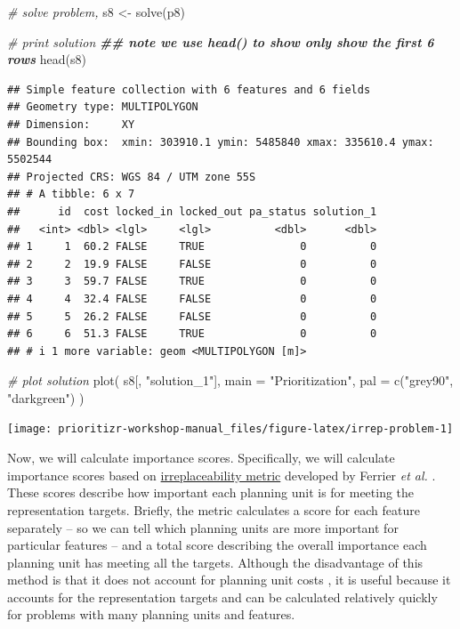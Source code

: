 \documentclass[
  12pt,
]{book}
\newenvironment{Shaded}{\begin{snugshade}}{\end{snugshade}}
\newcommand{\AttributeTok}[1]{\textcolor[rgb]{0.77,0.63,0.00}{#1}}
\newcommand{\CommentTok}[1]{\textcolor[rgb]{0.56,0.35,0.01}{\textit{#1}}}
\newcommand{\DocumentationTok}[1]{\textcolor[rgb]{0.56,0.35,0.01}{\textbf{\textit{#1}}}}
\newcommand{\FunctionTok}[1]{\textcolor[rgb]{0.00,0.00,0.00}{#1}}
\newcommand{\NormalTok}[1]{#1}
\newcommand{\OtherTok}[1]{\textcolor[rgb]{0.56,0.35,0.01}{#1}}
\newcommand{\StringTok}[1]{\textcolor[rgb]{0.31,0.60,0.02}{#1}}
\begin{document}
\begin{Shaded}
\begin{Highlighting}[]
\CommentTok{\# solve problem,}
\NormalTok{s8 }\OtherTok{\textless{}{-}} \FunctionTok{solve}\NormalTok{(p8)}

\CommentTok{\# print solution}
\DocumentationTok{\#\# note we use head() to show only show the first 6 rows}
\FunctionTok{head}\NormalTok{(s8)}
\end{Highlighting}
\end{Shaded}

\begin{verbatim}
## Simple feature collection with 6 features and 6 fields
## Geometry type: MULTIPOLYGON
## Dimension:     XY
## Bounding box:  xmin: 303910.1 ymin: 5485840 xmax: 335610.4 ymax: 5502544
## Projected CRS: WGS 84 / UTM zone 55S
## # A tibble: 6 x 7
##      id  cost locked_in locked_out pa_status solution_1
##   <int> <dbl> <lgl>     <lgl>          <dbl>      <dbl>
## 1     1  60.2 FALSE     TRUE               0          0
## 2     2  19.9 FALSE     FALSE              0          0
## 3     3  59.7 FALSE     TRUE               0          0
## 4     4  32.4 FALSE     FALSE              0          0
## 5     5  26.2 FALSE     FALSE              0          0
## 6     6  51.3 FALSE     TRUE               0          0
## # i 1 more variable: geom <MULTIPOLYGON [m]>
\end{verbatim}

\begin{Shaded}
\begin{Highlighting}[]
\CommentTok{\# plot solution}
\FunctionTok{plot}\NormalTok{(}
\NormalTok{  s8[, }\StringTok{"solution\_1"}\NormalTok{], }\AttributeTok{main =} \StringTok{"Prioritization"}\NormalTok{,}
  \AttributeTok{pal =} \FunctionTok{c}\NormalTok{(}\StringTok{"grey90"}\NormalTok{, }\StringTok{"darkgreen"}\NormalTok{)}
\NormalTok{)}
\end{Highlighting}
\end{Shaded}

\begin{center}\texttt{[image: prioritizr-workshop-manual\_files/figure-latex/irrep-problem-1]} \end{center}

Now, we will calculate importance scores. Specifically, we will calculate importance scores based on \href{https://prioritizr.net/reference/eval_ferrier_importance.html}{irreplaceability metric} developed by Ferrier \emph{et al.} \citeyearpar{r4}. These scores describe how important each planning unit is for meeting the representation targets. Briefly, the metric calculates a score for each feature separately -- so we can tell which planning units are more important for particular features -- and a total score describing the overall importance each planning unit has meeting all the targets. Although the disadvantage of this method is that it does not account for planning unit costs \citep[c.f., \href{https://prioritizr.net/reference/eval_replacement_importance.html}{the replacement cost metric},][]{r14}, it is useful because it accounts for the representation targets and can be calculated relatively quickly for problems with many planning units and features.
\end{document}

